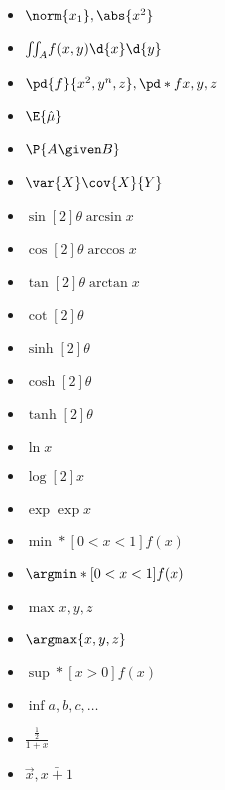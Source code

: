 \documentclass{minimal}
\begin{document}
	\begin{itemize}
		\item \(\norm{x_1}, \abs{x^2}\)
		\item \(\iint_A\! f(x,y) \d{x}\d{y}\)
		\item \(\pd{f}{x^2,y^n,z}, \pd*{f}{x,y,z}\)
		\item \(\E{\hat{\mu}}\)
		\item \(\P{A\given B}\)
		\item \(\var{X}\cov{X}{Y}\)
		\item \(\sin[2]{\theta}\arcsin{x}\)
		\item \(\cos[2]{\theta}\arccos{x}\)
		\item \(\tan[2]{\theta}\arctan{x}\)
		\item \(\cot[2]{\theta}\)
		\item \(\sinh[2]{\theta}\)
		\item \(\cosh[2]{\theta}\)
		\item \(\tanh[2]{\theta}\)
		\item \(\ln{x}\)
		\item \(\log[2]{x}\)
		\item \(\exp{\exp{x}}\)
		\item \(\min*[0<x<1]{f(x)}\)
		\item \(\argmin*[0<x<1]{f(x)}\)
		\item \(\max{x,y,z}\)
		\item \(\argmax{x,y,z}\)
		\item \(\sup*[x>0]{f(x)}\)
		\item \(\inf{a,b,c,\dotsc}\)
		\item \(\frac{\frac{1}{2}}{1+x}\)
		\item \(\vec{x}, \bar{x+1}\)
	\end{itemize}
\end{document}

